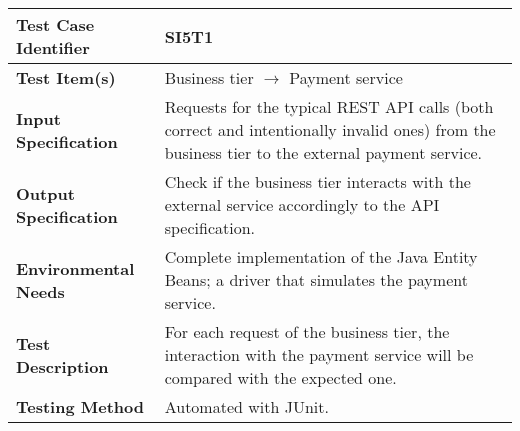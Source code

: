 \begin{tabular}{l p{}}
    \hline
    \textbf{Test Case Identifier} & SI5T1\\
    \hline
    \textbf{Test Item(s)} & Business tier $\rightarrow$ Payment service\\
    \hline
    \textbf{Input Specification} & Requests for the typical REST API calls (both correct and intentionally invalid ones) from the business tier to the external payment service.\\
    \hline
    \textbf{Output Specification} & Check if the business tier interacts with the external service accordingly to the API specification.\\
    \hline
    \textbf{Environmental Needs} & Complete implementation of the Java Entity Beans; a driver that simulates the payment service.\\
    \hline
    \textbf{Test Description} & For each request of the business tier, the interaction with the payment service will be compared with the expected one.\\
    \hline
    \textbf{Testing Method} & Automated with JUnit.\\
    \hline
\end{tabular}
